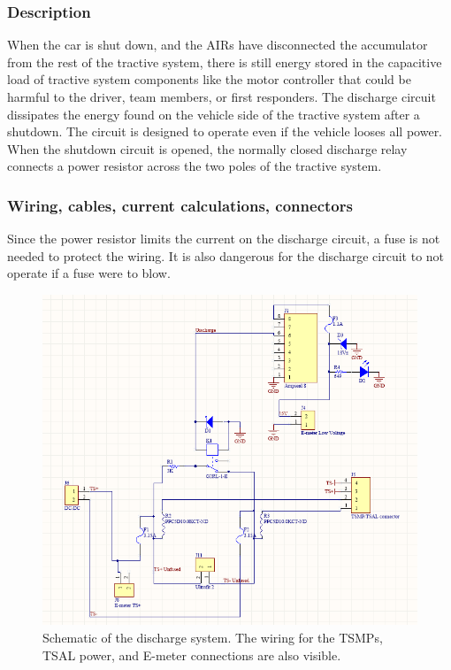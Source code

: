 \documentclass{article}
\begin{document}
\subsubsection{Description}
When the car is shut down, and the AIRs have disconnected the accumulator from the rest of the tractive system, there is still energy stored in the capacitive load of tractive system components like the motor controller that could be harmful to the driver, team members, or first responders. The discharge circuit dissipates the energy found on the vehicle side of the tractive system after a shutdown. The circuit is designed to operate even if the vehicle looses all power. When the shutdown circuit is opened, the normally closed discharge relay connects a power resistor across the two poles of the tractive system.  

\subsubsection{Wiring, cables, current calculations, connectors}

Since the power resistor limits the current on the discharge circuit, a fuse is not needed to protect the wiring. It is also dangerous for the discharge circuit to not operate if a fuse were to blow. 

\begin{figure}[H]
    \centering
    \includegraphics[width = 0.7 \textwidth]{Discharge.png}
    \caption{Schematic of the discharge system. The wiring for the TSMPs, TSAL power, and E-meter connections are also visible.}
    \label{discharge_schem}
\end{figure}
\end{document}
